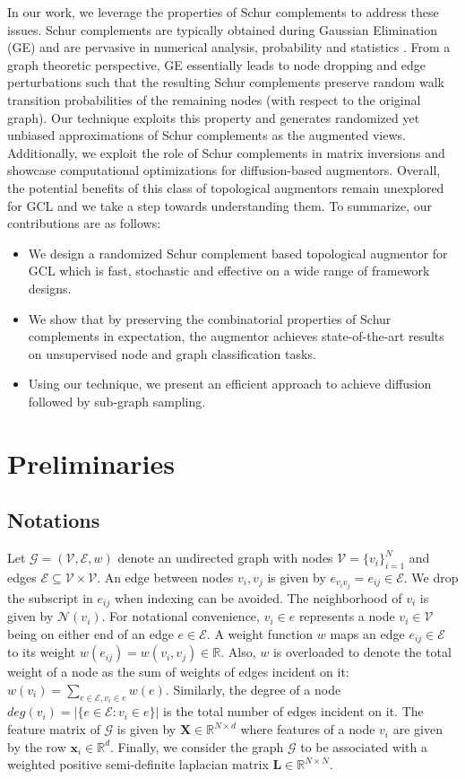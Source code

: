 \documentclass{article}
\def\mL{{\mathbf{L}}}
\def\mX{{\mathbf{X}}}
\def\vx{{\mathbf{x}}}
\def\gE{{\mathcal{E}}}
\def\gG{{\mathcal{G}}}
\def\gN{{\mathcal{N}}}
\def\gV{{\mathcal{V}}}
\def\sR{{\mathbb{R}}}
\theoremstyle{plain}
\theoremstyle{definition}
\theoremstyle{remark}
\begin{document}
In our work, we leverage the properties of Schur complements to address these issues. Schur complements are typically obtained during Gaussian Elimination (GE) and are pervasive in numerical analysis, probability and statistics \citep{cottle1974manifestations, ouellette1981schur, zhang2006schur}. From a graph theoretic perspective, GE essentially leads to node dropping and edge perturbations such that the resulting Schur complements preserve random walk transition probabilities of the remaining nodes (with respect to the original graph). Our technique exploits this property and generates randomized yet unbiased approximations of Schur complements as the augmented views. Additionally, we exploit the role of Schur complements in matrix inversions and showcase computational optimizations for diffusion-based augmentors. Overall, the potential benefits of this class of topological augmentors remain unexplored for GCL and we take a step towards understanding them. To summarize, our contributions are as follows:
\begin{itemize}
    \item We design a randomized Schur complement based topological augmentor for GCL which is fast, stochastic and effective on a wide range of framework designs.
    \item We show that by preserving the combinatorial properties of Schur complements in expectation, the augmentor achieves state-of-the-art results on unsupervised node and graph classification tasks.
    \item Using our technique, we present an efficient approach to achieve diffusion followed by sub-graph sampling.
\end{itemize}

\section{Preliminaries}
\subsection{Notations}
Let $\gG=(\gV, \gE, w)$ denote an undirected graph with nodes $\gV = \{v_i\}_{i=1}^N$ and edges $\gE \subseteq \gV \times \gV$. An edge between nodes $v_i, v_j$ is given by $e_{v_iv_j}=e_{ij} \in \gE$. We drop the subscript in $e_{ij}$ when indexing can be avoided. The neighborhood of $v_i$ is given by $\gN(v_i)$. For notational convenience, $v_i \in e$ represents a node $v_i \in \gV$ being on either end of an edge $e \in \gE$. A weight function $w$ maps an edge $e_{ij} \in \gE$ to its weight $w(e_{ij}) = w(v_i, v_j) \in \sR$. Also, $w$ is overloaded to denote the total weight of a node as the sum of weights of edges incident on it: $w(v_i) = \sum_{e\in \gE, v_i \in e}w(e)$. Similarly, the degree of a node $deg(v_i) = |\{e \in \gE: v_i \in e\}|$ is the total number of edges incident on it. The feature matrix of $\gG$ is given by $\mX \in \sR^{N \times d}$ where features of a node $v_i$ are given by the row $\vx_i \in \sR^d$. Finally, we consider the graph $\gG$ to be associated with a weighted positive semi-definite laplacian matrix $\mL \in \sR^{N \times N}$. 
\end{document}
